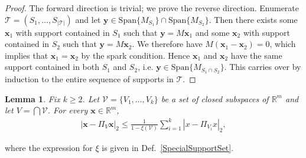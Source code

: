 \documentclass[journal, onecolumn]{IEEEtran}
\newtheorem{lemma}{Lemma}
\begin{document}
\begin{proof}The forward direction is trivial; we prove the reverse direction. Enumerate $\mathcal{T} = (S_1, \ldots, S_{|\mathcal{T}|})$ and let $\mathbf{y} \in \text{Span}\{M_{S_1}\} \cap \text{Span}\{M_{S_2}\}$. Then there exists some $\mathbf{x}_1$ with support contained in $S_1$ such that $\mathbf{y} = M\mathbf{x}_1$ and some $\mathbf{x}_2$ with support contained in $S_2$ such that $\mathbf{y} = M\mathbf{x}_2$. We therefore have $M(\mathbf{x}_1 - \mathbf{x}_2) = 0$, which implies that $\mathbf{x}_1 = \mathbf{x}_2$ by the spark condition. Hence $\mathbf{x}_1$ and $\mathbf{x}_2$ have the same support contained in both $S_1$ and $S_2$, i.e. $\mathbf{y} \in \text{Span}\{M_{S_1 \cap S_2}\}$. This carries over by induction to the entire sequence of supports in $\mathcal{T}$. 
\end{proof}


\begin{lemma}\label{DistanceToIntersectionLemma}
Fix $k \geq 2$. Let $\mathcal{V} = \{V_1, \ldots, V_k\}$ be a set of closed subspaces of $\mathbb{R}^m$ and let $V = \bigcap \mathcal{V}$. For every $\mathbf{x} \in \mathbb{R}^m$,
\begin{align}\label{DTILeq}
|\mathbf{x} - \Pi_V \mathbf{x}|_2 \leq \frac{1}{1 - \xi(\mathcal{V})} \sum_{i=1}^k |x - \Pi_{V_i} x|_2,
\end{align}
\end{lemma}
where the expression for $\xi$ is given in Def.~\ref{SpecialSupportSet}.
\end{document}
